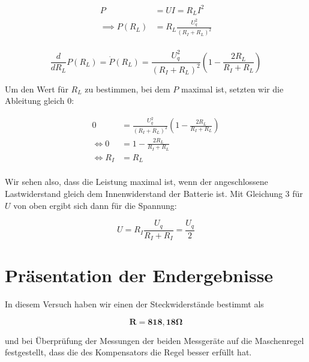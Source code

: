\documentclass{article}
\begin{document}
\begin{equation}
    \begin{split}
        P&=UI=R_LI^2 \\
        \implies P(R_L) &= R_L \frac{U_q^2}{(R_I + R_L)^2} \\ 
    \end{split}
\end{equation}

\begin{equation}
    \frac{d}{dR_L} P(R_L) = \Dot{P}(R_L) = \frac{U_q^2}{(R_I + R_L)^2} \left( 1 - \frac{2R_L}{R_I + R_L} \right)
\end{equation}

\bigskip
Um den Wert für $R_L$ zu bestimmen, bei dem $P$ maximal ist, setzten wir die Ableitung gleich 0:

\begin{equation}
    \begin{split}
        0 &= \frac{U_q^2}{(R_I + R_L)^2} \left( 1 - \frac{2R_L}{R_I + R_L} \right) \\
        \iff 0 &= 1 - \frac{2R_L}{R_I + R_L} \\
        \iff R_I &= R_L \\
    \end{split}
\end{equation}

Wir sehen also, dass die Leistung maximal ist, wenn der angeschlossene Lastwiderstand gleich dem Innenwiderstand der Batterie ist. Mit Gleichung 3 für $U$ von oben ergibt sich dann für die Spannung:

\begin{equation}
    U = R_I \frac{U_q}{R_I+R_I} = \frac{U_q}{2}
\end{equation}

\newpage
\section{Präsentation der Endergebnisse}

In diesem Versuch haben wir einen der Steckwiderstände bestimmt als

\begin{equation}
    \bm{R} = \bm{818,18 \Omega}
\end{equation}

und bei Überprüfung der Messungen der beiden Messgeräte auf die Maschenregel festgestellt, dass die des Kompensators die Regel besser erfüllt hat.
\end{document}
